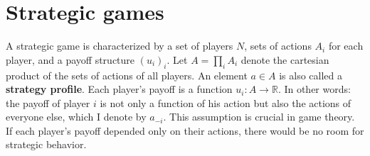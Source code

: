 \documentclass[../../main.tex]{subfiles}
\begin{document}
    \section{Strategic games}
    A strategic game is characterized by a set of players $N$, sets of actions $A_i$ for each player, and a payoff structure $(u_i)_i$. Let $A = \prod_i A_i$ denote the cartesian product of the sets of actions of all players. An element $a\in A$ is also called a \textbf{strategy profile}. Each player's payoff is a function $u_i\colon A\to\mathbb{R}$. In other words: the payoff of player $i$ is not only a function of his action but also the actions of everyone else, which I denote by $a_{-i}$. This assumption is crucial in game theory. If each player's payoff depended only on their actions, there would be no room for strategic behavior.
\end{document}

